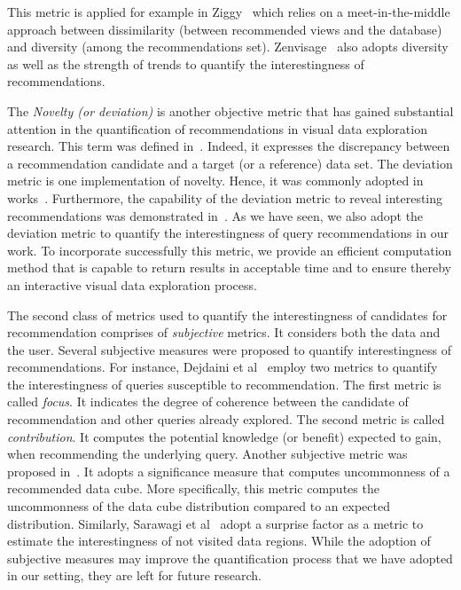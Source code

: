 This metric is applied for example in  Ziggy~\cite{Sellam:16} which relies on a meet-in-the-middle approach between dissimilarity (between recommended views and the database) and diversity (among the recommendations set). Zenvisage~\cite{Siddiqui:2016} also adopts diversity as well as the strength of trends to quantify the interestingness of recommendations. 

The \emph{Novelty (or deviation)} is another objective metric that has gained substantial attention in the quantification of recommendations in visual data exploration research. This term was defined in~\cite{Kaminskas:2016}.  Indeed, it expresses the discrepancy between a recommendation candidate and a target (or a reference) data set.
The deviation metric is one implementation of novelty. Hence, it was commonly adopted in works~\cite{Vartak,Ehsan:18,Lee:2019,MafrurSK18}. Furthermore, the capability of the deviation metric to reveal interesting recommendations was demonstrated in~\cite{Vartak}.
As we have seen, we also adopt the deviation metric to quantify the interestingness of query recommendations in our work.
To incorporate successfully this metric, we provide an efficient computation method that is capable to return results in acceptable time and to ensure thereby an interactive visual data exploration process.


The second class of metrics used to quantify the interestingness of candidates for recommendation comprises of \emph{subjective} metrics.
It considers both the data and the user. 
Several subjective measures were proposed to quantify interestingness of recommendations.
For instance, Dejdaini et al~\cite{DjedainiLMP17,DjedainiDLMPV19} employ two metrics to quantify the interestingness of queries susceptible to recommendation.
The first metric is called \emph{focus}. It indicates the degree of coherence between the candidate of recommendation and other queries already explored. The second metric is called \emph{contribution}. It computes the potential knowledge (or benefit) expected to gain, when recommending the underlying query.
Another subjective metric was proposed in~\cite{Tang:2017}. It adopts a significance measure that computes uncommonness of a recommended data cube.
More specifically, this metric computes the uncommonness of the data cube distribution compared to an expected distribution.
Similarly, Sarawagi et al~\cite{Sarawagi00} adopt a surprise factor as a metric to estimate the interestingness of not visited data regions.
While the adoption of subjective measures may improve the quantification process that we have adopted in our setting, they are left for future research.


